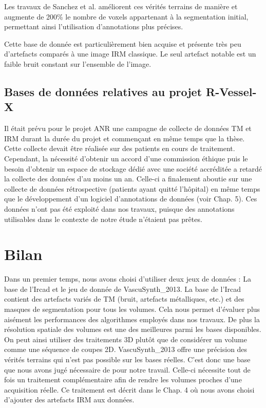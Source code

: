 Les travaux de Sanchez et al. \cite{} améliorent ces vérités terrains de manière et augmente de 200\% le nombre de voxels appartenant à la segmentation initial, permettant ainsi l'utilisation d'annotations plus précises.

Cette base de donnée est particulièrement bien acquise et présente très peu d'artefacts comparés à une image IRM classique. Le seul artefact notable est un faible bruit constant sur l'ensemble de l'image.

\subsection{Bases de données relatives au projet R-Vessel-X}

Il était prévu pour le projet ANR une campagne de collecte de données TM et IRM durant la durée du projet et commençant en même temps que la thèse. Cette collecte devait être réalisée sur des patients en cours de traitement. Cependant, la nécessité d'obtenir un accord d'une commission éthique puis le besoin d'obtenir un espace de stockage dédié avec une société accréditée a retardé la collecte des données d'au moins un an. Celle-ci a finalement aboutie sur une collecte de données rétrospective (patients ayant quitté l'hôpital) en même temps que le développement d'un logiciel d'annotations de données (voir Chap. 5). Ces données n'ont pas été exploité dans nos travaux, puisque des annotations utilisables dans le contexte de notre étude n'étaient pas prêtes.

\section{Bilan}

Dans un premier temps, nous avons choisi d'utiliser deux jeux de données : La base de l'Ircad et le jeu de donnée de VascuSynth\_2013. La base de l'Ircad contient des artefacts variés de TM (bruit, artefacts métalliques, etc.) et des masques de segmentation pour tous les volumes. Cela nous permet d'évaluer plus aisément les performances des algorithmes employés dans nos travaux. De plus la résolution spatiale des volumes est une des meilleures parmi les bases disponibles. On peut ainsi utiliser des traitements 3D plutôt que de considérer un volume comme une séquence de coupes 2D. VascuSynth\_2013 offre une précision des vérités terrains qui n'est pas possible sur les bases réelles. C'est donc une base que nous avons jugé nécessaire de pour notre travail. Celle-ci nécessite tout de fois un traitement complémentaire afin de rendre les volumes proches d'une acquisition réelle. Ce traitement est décrit dans le Chap. 4 où nous avons choisi d'ajouter des artefacts IRM aux données.

